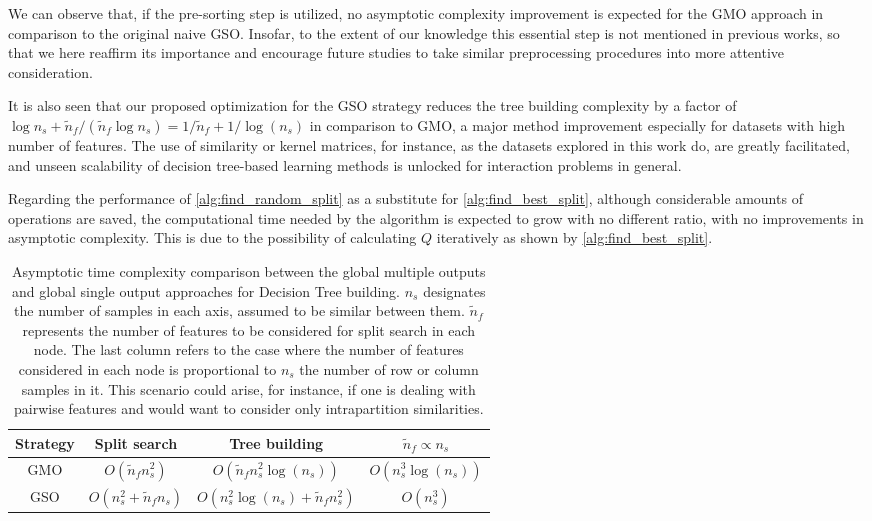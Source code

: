 \documentclass[conference]{IEEEtran}
\begin{document}
We can observe that, if the pre-sorting step is utilized, no asymptotic complexity improvement is expected for the GMO approach in comparison to the original naive GSO. Insofar, to the extent of our knowledge this essential step is not mentioned in previous works, so that we here reaffirm its importance and encourage future studies to take similar preprocessing procedures into more attentive consideration.

It is also seen that our proposed optimization for the GSO strategy reduces the tree building complexity by a factor of $\log n_s + \tilde n_f / (\tilde n_f \log n_s ) = 1/\tilde n_f + 1/\log(n_s)$ in comparison to GMO, a major method improvement especially for datasets with high number of features. The use of similarity or kernel matrices, for instance, as the datasets explored in this work do, are greatly facilitated, and unseen scalability of decision tree-based learning methods is unlocked for interaction problems in general.

Regarding the performance of \ref{alg:find_random_split} as a substitute for \ref{alg:find_best_split}, although considerable amounts of operations are saved, the computational time needed by the algorithm is expected to grow with no different ratio, with no improvements in asymptotic complexity. This is due to the possibility of calculating $Q$ iteratively as shown by \ref{alg:find_best_split}.

\begin{table*}[h]
    \centering
    \begin{tabular}{c|c|c|c}
        Strategy & Split search & Tree building & $\tilde n_f \propto n_s$
        \\
        \hline \hline
        GMO
            & $O(\tilde n_f n_s^2)$
            & $O(\tilde n_f n_s^2\log(n_s))$
            & $O(n_s^3\log(n_s))$
        \\
        GSO
            & $O(n_s^2 + \tilde n_f n_s)$
            & $O(n_s^2\log(n_s) + \tilde n_f n_s^2)$
            & $O(n_s^3)$
        \\
        \hline
    \end{tabular}
    \caption{
        Asymptotic time complexity comparison between the global multiple outputs
        and global single output approaches for Decision Tree building. $n_s$ designates the number of samples in each axis, assumed to be similar between them. $\tilde n_f$ represents the number of features to be considered for split search in each node. The last column refers to the case where the number of features considered in each node is proportional to $n_s$ the number of row or column samples in it. This scenario could arise, for instance, if one is dealing with pairwise features and would want to consider only intrapartition similarities. 
    }
    \label{tab:O_comparison}
\end{table*}
\end{document}
